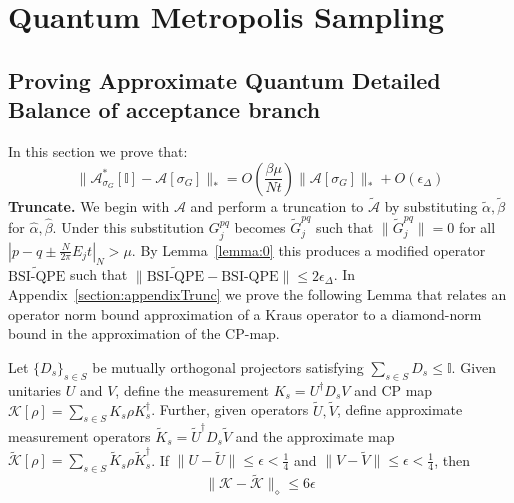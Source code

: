 
\chapter{Quantum Metropolis Sampling}
\graphicspath{{Appendix2/Figs/}}


\section{Proving Approximate Quantum Detailed Balance of acceptance branch}
\label{appendix:Aproof}
In this section we prove that:
\begin{equation}
    \|\mathcal{A}^*_{\sigma_G}[\mathbb{I}] - \mathcal{A}[\sigma_G]\|_* = O\!\left(\frac{\beta\mu}{Nt}\right)\|\mathcal{A}[\sigma_G]\|_* + O\!\left(\epsilon_{\Delta}\right)
\end{equation}
\textbf{Truncate.} We begin with $\mathcal{A}$ and perform a truncation to $\tilde{\mathcal{A}}$ by substituting $\tilde \alpha, \tilde \beta$ for $\hat \alpha, \hat \beta$. Under this substitution $G^{pq}_j$ becomes $\tilde G^{pq}_j$ such that $\|\tilde G^{pq}_j\| =0$ for all $|p-q\pm\frac{N}{2\pi}E_jt|_{N} > \mu$.  By Lemma~\ref{lemma:0} this produces a modified operator $\widetilde{\text{BSI-QPE}}$ such that $\|\widetilde{\text{BSI-QPE}}- \text{BSI-QPE}\| \leq 2\epsilon_{\Delta}$. In Appendix~\ref{section:appendixTrunc} we prove the following Lemma that relates an operator norm bound approximation of a Kraus operator to a diamond-norm bound in the approximation of the CP-map.
\begin{lemma}
\label{lemma:3}
Let $\{D_s\}_{s\in S}$ be mutually orthogonal projectors satisfying $\sum_{s\in S} D_s \leq \mathbb{I}$. Given unitaries $U$ and $V$, define the measurement $K_s = U^{\dagger}D_s V$ and CP map $\mathcal{K}[\rho] = \sum_{s \in S} K_s\rho K_s^{\dagger}$. Further, given operators $\tilde U, \tilde V$, define approximate measurement operators $\tilde K_s = \tilde U^{\dagger}D_s \tilde V$ and the approximate map $\tilde{\mathcal{K}}[\rho] = \sum_{s \in S} \tilde K_s\rho \tilde K_s^{\dagger}$. If $\|U-\tilde U\| \leq \epsilon<\frac14$ and $\|V-\tilde V\| \leq \epsilon<\frac14$, then 
\begin{equation}
    \|\mathcal{K} - \tilde{\mathcal{K}}\|_{\diamond} \leq 6\epsilon
\end{equation}
\end{lemma}
